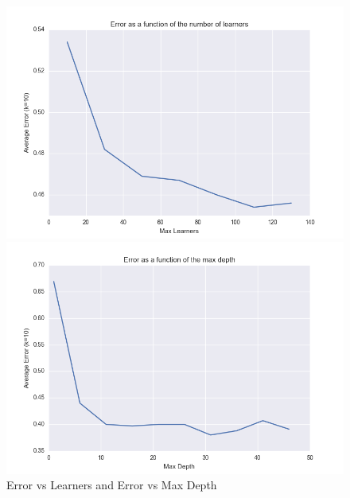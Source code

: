 \documentclass{article} %
\begin{document}
\begin{figure}[!ht]
\begin{center}
\caption{Error vs Learners and Error vs Max Depth}
\begin{minipage}[b]{0.45\linewidth}
	\includegraphics[scale=0.35]{ErrorVsLearners-RandomForest.png}
\end{minipage}
\quad
\begin{minipage}[b]{0.45\linewidth}
	\includegraphics[scale=0.35]{ErrorVsMaxDepth-RandomForest.png}
\end{minipage}
\end{center}
\end{figure}
\end{document}
